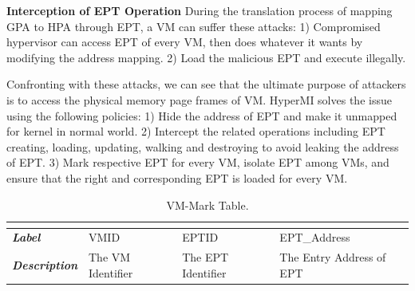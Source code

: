 \documentclass[conference]{IEEEtran}
\begin{document}
\textbf{Interception of EPT Operation }
During the translation process of mapping GPA to HPA through EPT, a VM can suffer these attacks: 1) Compromised hypervisor can access EPT of every VM, then does whatever it wants by modifying the address mapping. 2) Load the malicious EPT and execute illegally.

Confronting with these attacks, we can see that the ultimate purpose of attackers is to access the physical memory page frames of VM. HyperMI solves the issue using the following policies: 1) Hide the address of EPT and make it unmapped for kernel in normal world. 2) Intercept the related operations including EPT creating, loading, updating, walking and destroying to avoid leaking the address of EPT. 3) Mark respective EPT for every VM, isolate EPT among VMs, and ensure that the right and corresponding EPT is loaded for every VM.




\begin{table}[htbp]
\centering
\caption{VM-Mark Table.}\label{tab1}
\begin{tabular}{p{1.4cm}|p{1.2cm}|p{1.1cm}|p{1.7cm}}
\hline
\multicolumn{4}{c}{\bfseries\textbf\centering{VM-Mark Table}}\\
\hline
{\itshape\bfseries Label} & VMID & EPTID & EPT\_Address\\
\hline
{\itshape\bfseries Description} & { The VM Identifier} & The EPT Identifier & The Entry Address of EPT\\
\hline
\end{tabular}
\end{table}
\end{document}
